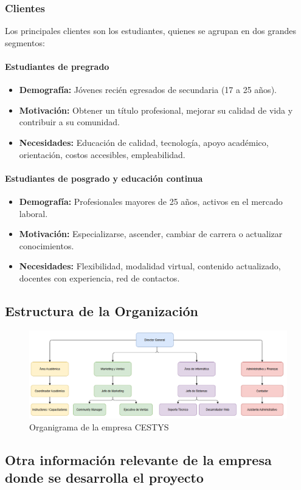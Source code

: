 \subsubsection{Clientes}
Los principales clientes son los estudiantes, quienes se agrupan en dos grandes segmentos:

\paragraph{Estudiantes de pregrado}
\begin{itemize}
	\item \textbf{Demografía:} Jóvenes recién egresados de secundaria (17 a 25 años).
	\item \textbf{Motivación:} Obtener un título profesional, mejorar su calidad de vida y contribuir a su comunidad.
	\item \textbf{Necesidades:} Educación de calidad, tecnología, apoyo académico, orientación, costos accesibles, empleabilidad.
\end{itemize}

\paragraph{Estudiantes de posgrado y educación continua}
\begin{itemize}
	\item \textbf{Demografía:} Profesionales mayores de 25 años, activos en el mercado laboral.
	\item \textbf{Motivación:} Especializarse, ascender, cambiar de carrera o actualizar conocimientos.
	\item \textbf{Necesidades:} Flexibilidad, modalidad virtual, contenido actualizado, docentes con experiencia, red de contactos.
\end{itemize}

\subsection{Estructura de la Organización}
\begin{figure}[H]
	\centering
	\caption{Organigrama de la empresa CESTYS}
	\label{fig:27-11-08-2025-13}
	\includegraphics[width=1\linewidth]{figuras/27-11-08-2025-13}
\end{figure}


\subsection{Otra información relevante de la empresa donde se desarrolla el proyecto}

